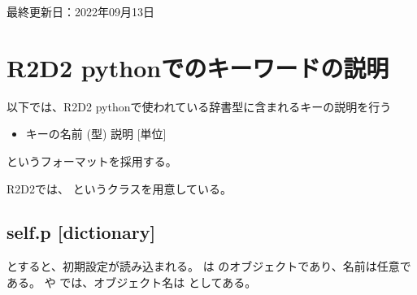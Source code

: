 \documentclass[letterpaper,10pt,dvipdfmx,report]{sphinxmanual}
\begin{document}
\sphinxAtStartPar
最終更新日：2022年09月13日

\sphinxstepscope


\chapter{R2D2 pythonでのキーワードの説明}
\label{\detokenize{notation:r2d2-python}}\label{\detokenize{notation::doc}}
\sphinxAtStartPar
以下では、R2D2 pythonで使われている辞書型に含まれるキーの説明を行う
\begin{itemize}
\item {} 
\sphinxAtStartPar
キーの名前 (型) \sphinxhyphen{}\sphinxhyphen{} 説明 {[}単位{]}

\end{itemize}

\sphinxAtStartPar
というフォーマットを採用する。

\sphinxAtStartPar
R2D2では、 というクラスを用意している。


\section{self.p {[}dictionary{]}}
\label{\detokenize{notation:self-p-dictionary}}
\begin{sphinxVerbatim}[commandchars=\\\{\}]
 
  
\end{sphinxVerbatim}

\sphinxAtStartPar
とすると、初期設定が読み込まれる。  は  のオブジェクトであり、名前は任意である。  や  では、オブジェクト名は  としてある。
\end{document}
